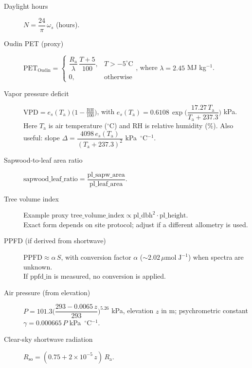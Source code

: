 \begin{description}
  \item[Daylight hours] $N = \dfrac{24}{\pi}\,\omega_s$ (hours).

  \item[Oudin PET (proxy)] $\mathrm{PET}_\mathrm{Oudin} = \begin{cases}
    \dfrac{R_\mathrm{a}}{\lambda}\,\dfrac{T+5}{100}, & T>-5^\circ\!\mathrm{C} \\
    0, & \text{otherwise}
  \end{cases}$, where $\lambda=2.45$ MJ kg$^{-1}$.

  \item[Vapor pressure deficit] $\mathrm{VPD} = e_s(T_\mathrm{a}) \Big(1 - \tfrac{\mathrm{RH}}{100}\Big)$, with $e_s(T_\mathrm{a}) = 0.6108\,\exp\!\Big(\dfrac{17.27\,T_\mathrm{a}}{T_\mathrm{a}+237.3}\Big)$ kPa.\\
  Here $T_\mathrm{a}$ is air temperature ($^\circ$C) and RH is relative humidity (\%). Also useful: slope $\Delta=\dfrac{4098\,e_s(T_\mathrm{a})}{(T_\mathrm{a}+237.3)^2}$ kPa $\,^{\circ}\!$C$^{-1}$.

  \item[Sapwood-to-leaf area ratio] $\mathrm{sapwood\_leaf\_ratio} = \dfrac{\mathrm{pl\_sapw\_area}}{\mathrm{pl\_leaf\_area}}$.

  \item[Tree volume index] Example proxy $\mathrm{tree\_volume\_index} \propto \mathrm{pl\_dbh}^2 \cdot \mathrm{pl\_height}$.\\
  Exact form depends on site protocol; adjust if a different allometry is used.

  \item[PPFD (if derived from shortwave)] $\mathrm{PPFD} \approx \alpha\, S$, with conversion factor $\alpha$ ($\sim 2.02\,\mu\mathrm{mol}\;\mathrm{J}^{-1}$) when spectra are unknown.\\
  If $\mathrm{ppfd\_in}$ is measured, no conversion is applied.

  \item[Air pressure (from elevation)] $P=101.3\Big(\dfrac{293-0.0065\,z}{293}\Big)^{5.26}$ kPa, elevation $z$ in m; psychrometric constant $\gamma=0.000665\,P$ kPa $\,^{\circ}\!$C$^{-1}$.

  \item[Clear-sky shortwave radiation] $R_\mathrm{so}=(0.75+2\times10^{-5}\,z)\,R_\mathrm{a}$.
\end{description}
